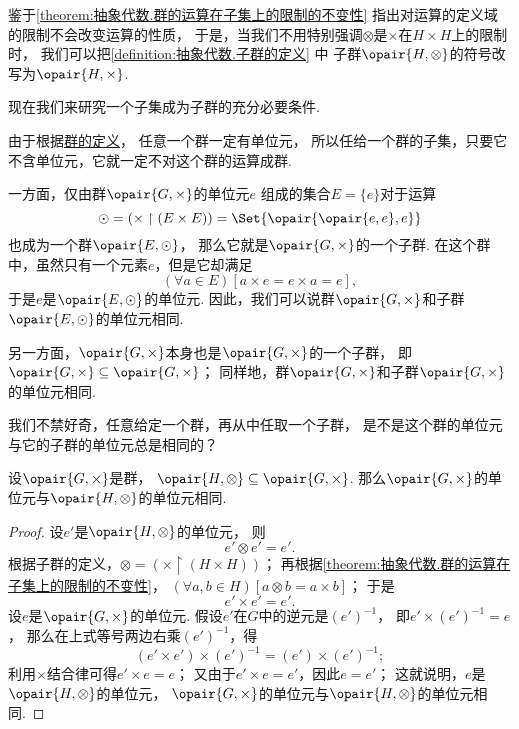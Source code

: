 鉴于\cref{theorem:抽象代数.群的运算在子集上的限制的不变性}
指出对运算的定义域的限制不会改变运算的性质，
于是，当我们不用特别强调\(\otimes\)是\(\times\)在\(H\times H\)上的限制时，
我们可以把\cref{definition:抽象代数.子群的定义} 中
子群\(\opair{H,\otimes}\)的符号改写为\(\opair{H,\times}\).

现在我们来研究一个子集成为子群的充分必要条件.

由于根据\hyperref[definition:抽象代数.群的定义]{群的定义}，
任意一个群一定有单位元，
所以任给一个群的子集，只要它不含单位元，它就一定不对这个群的运算成群.

一方面，仅由群\(\opair{G,\times}\)的单位元\(e\)%
组成的集合\(E=\{e\}\)对于运算\[
	\odot=(\times\upharpoonright(E\times E))
	= \Set{\opair{\opair{e,e},e}}
\]
也成为一个群\(\opair{E,\odot}\)，
那么它就是\(\opair{G,\times}\)的一个子群.
在这个群中，虽然只有一个元素\(e\)，但是它却满足\[
	(\forall a \in E)[a \times e = e \times a = e],
\]
于是\(e\)是\(\opair{E,\odot}\)的单位元.
因此，我们可以说群\(\opair{G,\times}\)和子群\(\opair{E,\odot}\)的单位元相同.

另一方面，\(\opair{G,\times}\)本身也是\(\opair{G,\times}\)的一个子群，
即\(\opair{G,\times}\subseteq\opair{G,\times}\)；
同样地，群\(\opair{G,\times}\)和子群\(\opair{G,\times}\)的单位元相同.

我们不禁好奇，任意给定一个群，再从中任取一个子群，
是不是这个群的单位元与它的子群的单位元总是相同的？

\begin{proposition}\label{theorem:抽象代数.子群.群的单位元与其子群的单位元相同}
设\(\opair{G,\times}\)是群，
\(\opair{H,\otimes}\subseteq\opair{G,\times}\).
那么\(\opair{G,\times}\)的单位元与\(\opair{H,\otimes}\)的单位元相同.
\begin{proof}
设\(e'\)是\(\opair{H,\otimes}\)的单位元，
则\[
	e' \otimes e' = e'.
\]
根据子群的定义，\(\otimes = (\times \upharpoonright(H \times H))\)；
再根据\cref{theorem:抽象代数.群的运算在子集上的限制的不变性}，
\((\forall a,b \in H)[a \otimes b = a \times b]\)；
于是\[
	e' \times e' = e'.
\]
设\(e\)是\(\opair{G,\times}\)的单位元.
假设\(e'\)在\(G\)中的逆元是\((e')^{-1}\)，
即\(e' \times (e')^{-1} = e\)，
那么在上式等号两边右乘\((e')^{-1}\)，得\[
	(e' \times e') \times (e')^{-1} = (e') \times (e')^{-1};
\]
利用\(\times\)结合律可得\(e' \times e = e\)；
又由于\(e' \times e = e'\)，因此\(e = e'\)；
这就说明，\(e\)是\(\opair{H,\otimes}\)的单位元，
\(\opair{G,\times}\)的单位元与\(\opair{H,\otimes}\)的单位元相同.
\end{proof}
\end{proposition}

